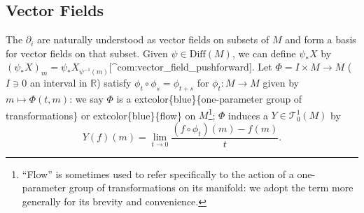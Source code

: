 \documentclass[
]{book}
\begin{document}
\hypertarget{vector-fields}{%
\subsection{Vector Fields}\label{vector-fields}}

The \(\partial_i\) are naturally understood as vector fields on subsets of \(M\) and form a basis for vector fields on that subset. Given \(\psi \in \text{Diff}(M)\), we can define \(\psi_* X\) by \((\psi_* X)_m = \psi_* X_{\psi^{-1}(m)}\){[}\^{}com:vector\_field\_pushforward{]}. Let \(\Phi = I \times M \to M\) (\(I \ni 0\) an interval in \(\mathbb{R}\)) satisfy \(\phi_t \circ \phi_s = \phi_{t+s}\) for \(\phi_t : M \to M\) given by \(m \mapsto \Phi(t,m)\): we say \(\Phi\) is a extcolor\{blue\}\{one-parameter group of transformations\} or extcolor\{blue\}\{flow\} on \(M\)\footnote{``Flow'' is sometimes used to refer specifically to the action of a one-parameter group of transformations on its manifold: we adopt the term more generally for its brevity and convenience.}; \(\Phi\) induces a \(Y \in \mathcal{T}_0^1(M)\) by
\begin{equation}     
    Y(f)(m) = \lim_{t \to 0}\frac{(f \circ \phi_t)(m) - f(m)}{t}. 
\end{equation}
\end{document}
